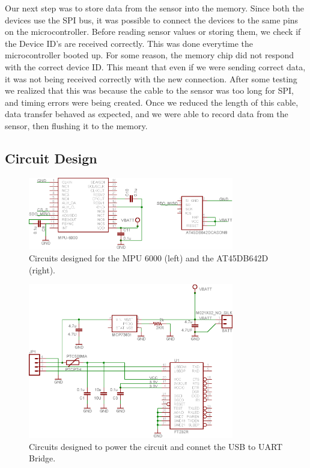 Our next step was to store data from the sensor into the memory.
Since both the devices use the SPI bus,
it was possible to connect the devices to the same pins on the microcontroller.
Before reading sensor values or storing them,
we check if the Device ID's are received correctly.
This was done everytime the microcontroller booted up.
For some reason, the memory chip did not respond with the correct device ID.
This meant that even if we were sending correct data,
it was not being received correctly with the new connection.
After some testing we realized that this was because the cable to the sensor was too long for SPI,
and timing errors were being created.
Once we reduced the length of this cable,
data transfer behaved as expected,
and we were able to record data from the sensor,
then flushing it to the memory.

\subsection{Circuit Design}
\label{Sec:CircuitDesign}

\begin{figure}
\begin{center}
\includegraphics[width=0.8\textwidth]{images/MPU6000Circuit.eps}
\caption{Circuits designed for the MPU 6000 (left) and the AT45DB642D (right).}
\label{Fig:MPUCkt}
\end{center}
\end{figure}

\begin{figure}
\begin{center}
\includegraphics[width=0.8\textwidth]{images/USBPOWER.eps}
\caption{Circuits designed to power the circuit and connet the USB to UART Bridge.}
\label{Fig:USBPOWER}
\end{center}
\end{figure}

